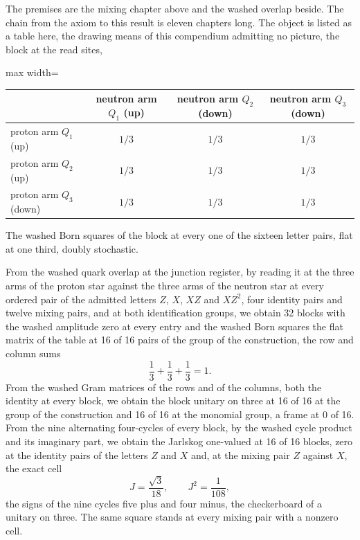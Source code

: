\begin{chproof}[exact]
The premises are the mixing chapter above and the washed overlap beside. The chain from the axiom to this result is eleven chapters long. The object is listed as a table here, the drawing means of this compendium admitting no picture, the block at the read sites,
\begin{center}\small
\begin{adjustbox}{max width=\linewidth}\begin{tabular}{lccc}
\hline
 & neutron arm $Q_1$ (up) & neutron arm $Q_2$ (down) & neutron arm $Q_3$ (down) \\
\hline
proton arm $Q_1$ (up) & $1/3$ & $1/3$ & $1/3$ \\
proton arm $Q_2$ (up) & $1/3$ & $1/3$ & $1/3$ \\
proton arm $Q_3$ (down) & $1/3$ & $1/3$ & $1/3$ \\
\hline
\end{tabular}\end{adjustbox}

The washed Born squares of the block at every one of the sixteen letter pairs, flat at one third, doubly stochastic.
\end{center}
From the washed quark overlap at the junction register, by reading it at the three arms of the proton star against the three arms of the neutron star at every ordered pair of the admitted letters $Z$, $X$, $XZ$ and $XZ^{2}$, four identity pairs and twelve mixing pairs, and at both identification groups, we obtain 32 blocks with the washed amplitude zero at every entry and the washed Born squares the flat matrix of the table at 16 of 16 pairs of the group of the construction, the row and column sums
\begin{equation}
\frac{1}{3} + \frac{1}{3} + \frac{1}{3} = 1 .
\end{equation}
From the washed Gram matrices of the rows and of the columns, both the identity at every block, we obtain the block unitary on three at 16 of 16 at the group of the construction and 16 of 16 at the monomial group, a frame at 0 of 16. From the nine alternating four-cycles of every block, by the washed cycle product and its imaginary part, we obtain the Jarlskog one-valued at 16 of 16 blocks, zero at the identity pairs of the letters $Z$ and $X$ and, at the mixing pair $Z$ against $X$, the exact cell
\begin{equation}
J = \frac{\sqrt{3}}{18}, \qquad J^{2} = \frac{1}{108},
\end{equation}
the signs of the nine cycles five plus and four minus, the checkerboard of a unitary on three. The same square stands at every mixing pair with a nonzero cell.


\end{chproof}
